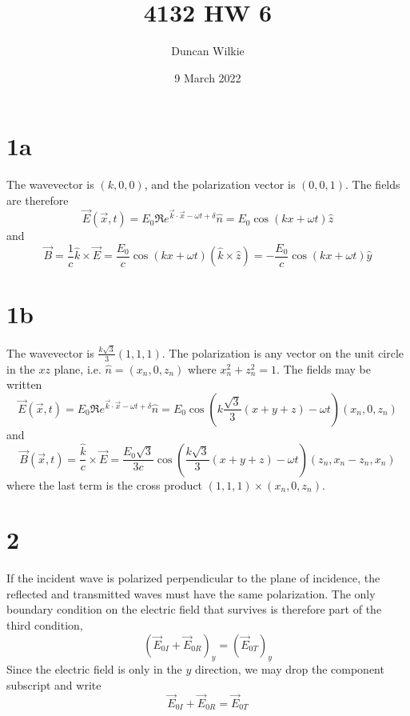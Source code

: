 \documentclass{article}
\title{4132 HW 6}
\author{Duncan Wilkie}
\date{9 March 2022}
\begin{document}
\maketitle

\section*{1a}
The wavevector is $(k,0,0)$, and the polarization vector is $(0,0,1)$.
The fields are therefore
\[\vec{E}(\vec{x},t)=E_{0}\Re e^{\vec{k}\cdot \vec{x}-\omega t+\delta}\hat{n}=E_{0}\cos(kx+\omega t)\hat{z}\]
and
\[\vec{B}=\frac{1}{c}\hat{k}\times\vec{E}=\frac{E_{0}}{c}\cos(kx+\omega t)(\hat{k}\times\hat{z})=-\frac{E_{0}}{c}\cos(kx+\omega t)\hat{y}\]

\section*{1b}
The wavevector is $\frac{k\sqrt{3}}{3}(1,1,1)$. The polarization is any vector on the unit circle in the $xz$ plane, i.e. $\hat{n}=(x_{n},0,z_{n})$ where $x_{n}^{2}+z_{n}^{2}=1$. The fields may be written
\[\vec{E}(\vec{x},t)=E_{0}\Re e^{\vec{k}\cdot\vec{x}-\omega t+\delta}\hat{n}=E_{0}\cos(k\frac{\sqrt{3}}{3}(x+y+z)-\omega t)(x_{n},0,z_{n})\]
and
\[\vec{B}(\vec{x},t)=\frac{\hat{k}}{c}\times \vec{E}=\frac{E_{0}\sqrt{3}}{3c}\cos(\frac{k\sqrt{3}}{3}(x+y+z)-\omega t)\left(z_{n}, x_{n}-z_{n}, x_{n}\right)\]
where the last term is the cross product $(1,1,1)\times(x_{n},0,z_{n})$.

\section*{2}
If the incident wave is polarized perpendicular to the plane of incidence, the reflected and transmitted waves must have the same polarization. The only boundary condition on the electric field that survives is therefore part of the third condition,
\[\left( \vec{E}_{0I}+\vec{E}_{0R} \right)_{y}=\left( \vec{E}_{0T} \right)_{y}\]
Since the electric field is only in the $y$ direction, we may drop the component subscript and write
\[\vec{E}_{0I}+\vec{E}_{0R}=\vec{E}_{0T}\]
\end{document}

